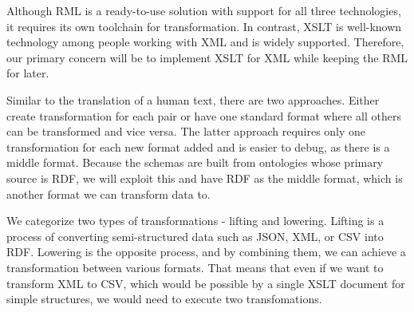 Although RML is a ready-to-use solution with support for all three technologies, it requires its own toolchain for transformation. In contrast, XSLT is well-known technology among people working with XML and is widely supported. Therefore, our primary concern will be to implement XSLT for XML while keeping the RML for later.

Similar to the translation of a human text, there are two approaches. Either create transformation for each pair or have one standard format where all others can be transformed and vice versa. The latter approach requires only one transformation for each new format added and is easier to debug, as there is a middle format. Because the schemas are built from ontologies whose primary source is RDF, we will exploit this and have RDF as the middle format, which is another format we can transform data to.

\medskip

We categorize two types of transformations - lifting and lowering. Lifting is a process of converting semi-structured data such as JSON, XML, or CSV into RDF. Lowering is the opposite process, and by combining them, we can achieve a transformation between various formats. That means that even if we want to transform XML to CSV, which would be possible by a single XSLT document for simple structures, we would need to execute two transfomations.

